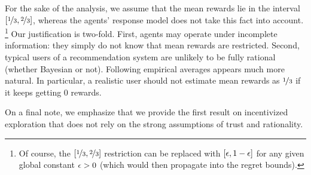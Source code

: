 For the sake of the analysis, we assume that the mean rewards lie in the interval
    $[\nicefrac{1}{3}, \nicefrac{2}{3}]$,
whereas the agents' response model does not take this fact into account.%
\footnote{Of course, the $[\nicefrac{1}{3}, \nicefrac{2}{3}]$ restriction can be replaced with $[\epsilon,1-\epsilon]$ for any given global constant $\epsilon>0$ (which would then propagate into the regret bounds).}
Our justification is two-fold. First, agents may operate under incomplete information: they simply do not know that mean rewards are restricted. Second, typical users of a recommendation system are unlikely to be fully rational (whether Bayesian or not). Following empirical averages appears much more natural. In particular, a realistic user should not estimate mean rewards as $\nicefrac{1}{3}$ if it keeps getting $0$ rewards.

On a final note, we emphasize that we provide the first result on incentivized exploration that does not rely on the strong assumptions of trust and rationality.









